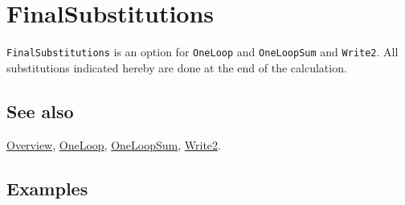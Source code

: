 \documentclass[../FeynCalcManual.tex]{subfiles}
\begin{document}
\hypertarget{finalsubstitutions}{
\section{FinalSubstitutions}\label{finalsubstitutions}}

\texttt{FinalSubstitutions} is an option for \texttt{OneLoop} and
\texttt{OneLoopSum} and \texttt{Write2}. All substitutions indicated
hereby are done at the end of the calculation.

\subsection{See also}

\hyperlink{toc}{Overview}, \hyperlink{oneloop}{OneLoop},
\hyperlink{oneloopsum}{OneLoopSum}, \hyperlink{write2}{Write2}.

\subsection{Examples}
\end{document}
